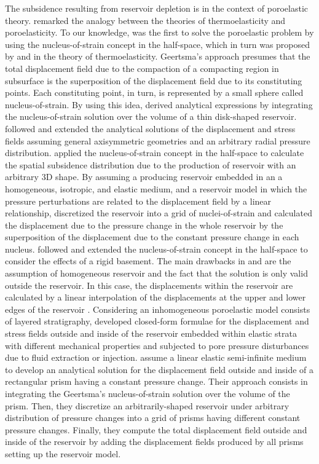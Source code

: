 \documentclass[P]{BrJG_submit}
\begin{document}
The subsidence resulting from reservoir depletion is in the context of poroelastic theory. 
\cite{Geertsma57} remarked the analogy between the theories of thermoelasticity and poroelasticity.
To our knowledge, \cite{Geertsma73} was the first to solve the poroelastic problem by using the nucleus-of-strain concept in the half-space, which in turn was proposed by \cite{Mindlin-Cheng50} and \cite{Sen51} in the theory of thermoelasticity.
Geertsma's approach presumes that the total displacement field due to the compaction of a
compacting region in subsurface is the superposition of the displacement field due to
its constituting points. 
Each constituting point, in turn, is represented by a small sphere called nucleus-of-strain. 
By using this idea, \cite{Geertsma73} derived analytical expressions by integrating the
nucleus-of-strain solution over the volume of a thin disk-shaped reservoir.
\cite{Segall92} followed \cite{Geertsma73} and extended the analytical solutions of the displacement and stress fields assuming general axisymmetric geometries and an arbitrary radial pressure distribution. 
\cite{Geertsma-Opstal73} applied the nucleus-of-strain concept in the half-space 
to calculate the spatial subsidence distribution due to the production of reservoir with an arbitrary 3D shape.
By assuming a producing reservoir embedded in an a homogeneous, isotropic, and elastic medium, and a reservoir model in which the pressure perturbations are related to the displacement field by a linear relationship, \cite{Geertsma-Opstal73} discretized the reservoir into a grid of  nuclei-of-strain and calculated the displacement due to the pressure change in the whole reservoir  by the superposition of the displacement due to the constant pressure change in each nucleus.
\cite{Tempone10} followed \cite{Geertsma-Opstal73} and 
extended the nucleus-of-strain concept in the half-space to consider the effects of a rigid basement. 
The main drawbacks in \cite{Geertsma-Opstal73} and \cite{Tempone10} are the assumption of homogeneous reservoir and the fact that the solution is only valid outside the reservoir.
In this case, the displacements within the reservoir are calculated by a linear interpolation of the displacements at the upper and lower edges of the reservoir \citep{Tempone12}.
Considering an inhomogeneous poroelastic model consists of layered stratigraphy, \cite{Mehrabian-Abousleiman15} developed closed-form formulae for the  displacement and stress  fields outside and inside of the reservoir embedded within elastic strata with different mechanical properties and subjected to pore pressure disturbances due to fluid extraction or injection. 
\cite{Munoz-Roehl17}  assume a linear elastic semi-infinite medium to develop an analytical solution for the  displacement field  outside and inside of a rectangular prism having a constant pressure change.
Their approach consists in integrating the Geertsma's nucleus-of-strain solution over the volume of the prism. Then, they discretize an arbitrarily-shaped reservoir under arbitrary distribution of pressure changes into a grid of  prisms having different constant pressure changes.
Finally, they compute the total displacement field outside and inside of the reservoir by adding the displacement fields produced by all prisms setting up the reservoir model.
 
\end{document}
